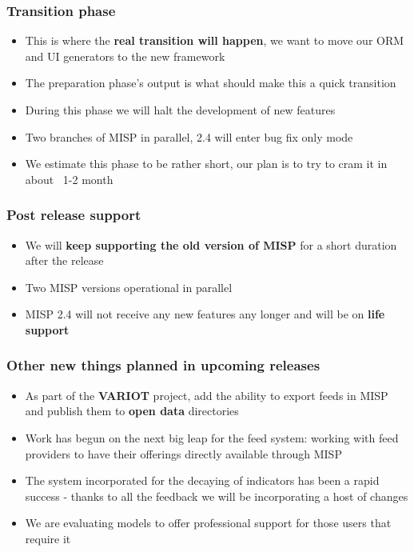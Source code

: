 \begin{frame}
  \frametitle{Transition phase}
  \begin{itemize}
    \item This is where the {\bf real transition will happen}, we want to move our ORM and UI generators to the new framework
    \item The preparation phase's output is what should make this a quick transition
    \item During this phase we will halt the development of new features
    \item Two branches of MISP in parallel, 2.4 will enter bug fix only mode
    \item We estimate this phase to be rather short, our plan is to try to cram it in about ~1-2 month
  \end{itemize}
\end{frame}

\begin{frame}
  \frametitle{Post release support}
  \begin{itemize}
    \item We will {\bf keep supporting the old version of MISP} for a short duration after the release
    \item Two MISP versions operational in parallel
    \item MISP 2.4 will not receive any new features any longer and will be on {\bf life support}
  \end{itemize}
\end{frame}

\begin{frame}
  \frametitle{Other new things planned in upcoming releases}
  \begin{itemize}
    \item As part of the {\bf VARIOT} project, add the ability to export feeds in MISP and publish them to {\bf open data} directories
    \item Work has begun on the next big leap for the feed system: working with feed providers to have their offerings directly available through MISP
    \item The system incorporated for the decaying of indicators has been a rapid success - thanks to all the feedback we will be incorporating a host of changes
    \item We are evaluating models to offer professional support for those users that require it
  \end{itemize}
\end{frame}

